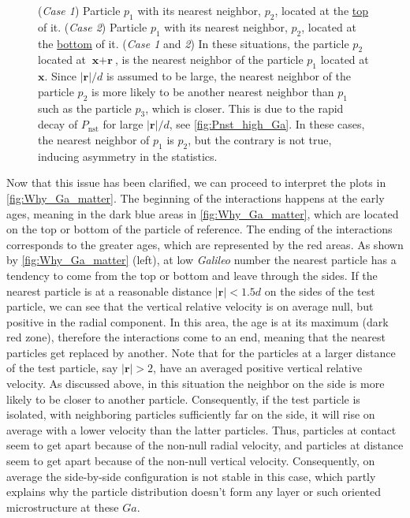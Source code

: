 \begin{figure}[h!]
{        (\textit{Case 1}) Particle $p_1$ with  its nearest neighbor, $p_2$, located at the \underline{top} of it. 
        (\textit{Case 2}) Particle $p_1$ with  its nearest neighbor, $p_2$, located at the \underline{bottom} of it. 
        (\textit{Case 1} and \textit{2})
        In these situations, the particle $p_2$ located at $\textbf{x} + \textbf{r}$, is the nearest neighbor of the particle $p_1$ located at $\textbf{x}$. 
        Since $|\textbf{r}|/d$ is assumed to be large, the nearest neighbor of the particle $p_2$ is more likely to be another nearest neighbor than $p_1$ such as the particle $p_3$, which is closer.
        This is due to the rapid decay of $P_\text{nst}$ for large $|\textbf{r}|/d$, see \ref{fig:Pnst_high_Ga}. 
        In these cases, the nearest neighbor of $p_1$ is $p_2$, but the contrary is not true, inducing asymmetry in the statistics.  
    }
    \label{fig:diagram_asym}
\end{figure}

Now that this issue has been clarified, we can proceed to interpret the plots in \ref{fig:Why_Ga_matter}.
The beginning of the interactions happens at the early ages, meaning in the dark blue areas in  \ref{fig:Why_Ga_matter}, which are located on the top or bottom of the particle of reference.
The ending of the interactions corresponds to the greater ages, which are represented by the red areas. 
As shown by \ref{fig:Why_Ga_matter} (left), at low \textit{Galileo} number the nearest particle has a tendency to come from the top or bottom and leave through the sides. 
If the nearest particle is at a reasonable distance $|\textbf{r}| < 1.5d$ on the sides of the test particle, we can see that the vertical relative velocity is on average null, but positive in the radial component.
In this area, the age is at its maximum (dark red zone), therefore the interactions come to an end, meaning that the nearest particles get replaced by another. 
Note that for the particles at a larger distance of the test particle, say $|\textbf{r}|>2$, have an averaged positive vertical relative velocity. 
As discussed above, in this situation the neighbor on the side is more likely to be closer to another particle. 
Consequently, if the test particle is isolated, with neighboring particles sufficiently far on the side, it will rise on average with a lower velocity than the latter particles.
Thus, particles at contact seem to get apart because of the non-null radial velocity, and particles at distance seem to get apart because of the non-null vertical velocity.  
Consequently, on average the side-by-side configuration is not stable in this case, which partly explains why the particle distribution doesn't form any layer or such oriented microstructure at these $Ga$.   

